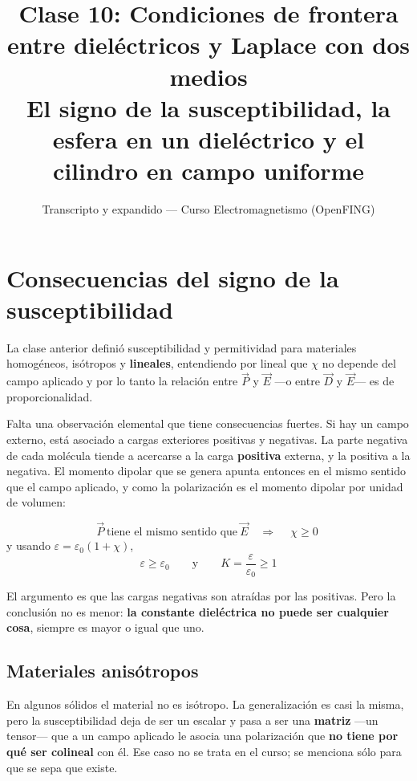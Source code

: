 \documentclass[12pt,a4paper]{article}
\title{\textbf{Clase 10: Condiciones de frontera entre dieléctricos y Laplace con dos medios} \\[0.3em]
        \large{El signo de la susceptibilidad, la esfera en un dieléctrico y el cilindro en campo uniforme}}
\author{Transcripto y expandido --- Curso Electromagnetismo (OpenFING)}
\date{}
\begin{document}
\maketitle
\thispagestyle{empty}
\newpage

\tableofcontents
\newpage

\section{Consecuencias del signo de la susceptibilidad}

La clase anterior definió susceptibilidad y permitividad para materiales
homogéneos, isótropos y \textbf{lineales}, entendiendo por lineal que $\chi$ no
depende del campo aplicado y por lo tanto la relación entre $\vec P$ y $\vec E$
---o entre $\vec D$ y $\vec E$--- es de proporcionalidad.

Falta una observación elemental que tiene consecuencias fuertes. Si hay un campo
externo, está asociado a cargas exteriores positivas y negativas. La parte
negativa de cada molécula tiende a acercarse a la carga \textbf{positiva}
externa, y la positiva a la negativa. El momento dipolar que se genera apunta
entonces en el mismo sentido que el campo aplicado, y como la polarización es el
momento dipolar por unidad de volumen:

\begin{keybox}
\[
\vec P \ \text{tiene el mismo sentido que}\ \vec E
\quad\Longrightarrow\quad
\boxed{\ \chi \ge 0\ }
\]
y usando $\varepsilon = \varepsilon_0(1+\chi)$,
\[
\boxed{\ \varepsilon \ge \varepsilon_0
\qquad\text{y}\qquad
K = \frac{\varepsilon}{\varepsilon_0} \ge 1 \ }
\]
\end{keybox}

\begin{notebox}
El argumento es que las cargas negativas son atraídas por las positivas. Pero la
conclusión no es menor: \textbf{la constante dieléctrica no puede ser cualquier
cosa}, siempre es mayor o igual que uno.
\end{notebox}

\subsection{Materiales anisótropos}

En algunos sólidos el material no es isótropo. La generalización es casi la
misma, pero la susceptibilidad deja de ser un escalar y pasa a ser una
\textbf{matriz} ---un tensor--- que a un campo aplicado le asocia una
polarización que \textbf{no tiene por qué ser colineal} con él. Ese caso no se
trata en el curso; se menciona sólo para que se sepa que existe.
\end{document}
